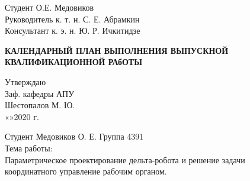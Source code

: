 \begin{flushleft}
 \hspace{1cm} Студент \hspace{7cm} \underline{\hspace{3cm}}  О.Е. Медовиков \\ 
 \vspace{5mm}
 \hspace{1cm} Руководитель \hspace{2cm} к. т. н. \hspace{2cm} \underline{\hspace{3cm}}  С. Е. Абрамкин\\ 
 \vspace{5mm}
 \hspace{1cm} Консультант \hspace{2.3cm} к. э. н. \hspace{2cm} \underline{\hspace{3cm}}  Ю. Р. Ичкитидзе\\
\end{flushleft}

\thispagestyle{empty} %

\newpage
\begin{center}
\large{\textbf{КАЛЕНДАРНЫЙ ПЛАН ВЫПОЛНЕНИЯ ВЫПУСКНОЙ КВАЛИФИКАЦИОННОЙ РАбОТЫ}}\\
\end{center}
\begin{flushright}
Утверждаю\\
Заф. кафедры АПУ\\
\underline{\hspace{3cm}} Шестопалов М. Ю.\\
«\underline{\hspace{0.7cm}}»\underline{\hspace{3cm}}2020 г.
\vspace{1cm}
\end{flushright}

\begin{flushleft}
Студент Медовиков О. Е. \hspace{7cm} Группа 4391\\
Тема работы:\\ Параметрическое проектирование дельта-робота и решение задачи\\ координатного управление рабочим органом.\\
\vspace{1cm}
\end{flushleft}



